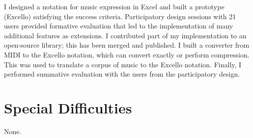 I designed a notation for music expression in Excel and built a prototype (Excello) satisfying the success criteria. Participatory design sessions with 21 users provided formative evaluation that led to the implementation of many additional features as extensions. I contributed part of my implementation to an open-source library; this has been merged and published. I built a converter from MIDI to the Excello notation, which can convert exactly or perform compression. This was used to translate a corpus of music to the Excello notation. Finally, I performed summative evaluation with the users from the participatory design.

\section*{Special Difficulties}

None.

\tableofcontents

